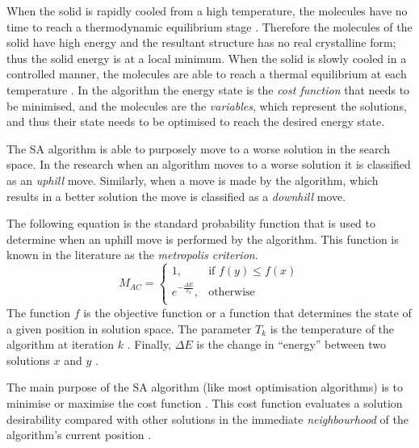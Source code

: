 When the solid is rapidly cooled from a high temperature, the molecules have no time to reach a thermodynamic equilibrium stage \cite{MobileRobotSA,ConstantTempSA}. Therefore the molecules of the solid have high energy and the resultant structure has no real crystalline form; thus the solid energy is at a local minimum\cite{CurveFittingSA,NewSAs,MobileRobotSA}. When the solid is slowly cooled in a controlled manner, the molecules are able to reach a thermal equilibrium at each temperature \cite{ChaosSA,CurveFittingSA,NewSAs}.
In the algorithm the energy state is the \emph{cost function} that needs to be minimised, and the molecules are the \emph{variables}, which represent the solutions, and thus their state needs to be optimised to reach the desired energy state.

The \gls{SA} algorithm is able to purposely move to a worse solution in the search space\cite{EcoEquilSA}. In the research when an algorithm moves to a worse solution it is classified as an \emph{uphill} move\cite{AIModernApproach}. Similarly, when a move is made by the algorithm, which results in a better solution the move is classified as a \emph{downhill} move\cite{AIModernApproach}.

The following equation is the standard probability function that is used to determine when an uphill move is performed by the algorithm. This function is known in the literature as the \emph{metropolis criterion}. 
\begin{equation}
\label{eq:saprobability}
	M_{AC} =
	\begin{cases}
	1, &\text{if $f(y) \leq f(x)$}\\
	e^{-\frac{\Delta E}{T_k}} , &\text{otherwise}\\
	\end{cases}
\end{equation}
The function $f$ is the objective function or a function that determines the state of a given position in solution space\cite{EcoEquilSA}. The parameter $T_k$ is the temperature of the algorithm at iteration $k$ \cite{EcoEquilSA}. Finally, $\Delta E$ is the change in ``energy'' between two solutions $x$ and $y$ \cite{EcoEquilSA}.

The main purpose of the \gls{SA} algorithm (like most optimisation algorithms) is to minimise or maximise the cost function \cite{SASingleMultiObj}. This cost function evaluates a solution desirability compared with other solutions in the immediate \emph{neighbourhood} of the algorithm's current position \cite{TheoPraticalSA}. 

